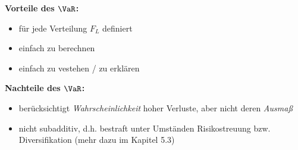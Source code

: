 \textbf{Vorteile des $\VaR$:}
\begin{itemize}[nolistsep, topsep=-\parskip]
	\item für jede Verteilung $F_L$ definiert
	\item einfach zu berechnen
	\item einfach zu vestehen / zu erklären
\end{itemize}

\textbf{Nachteile des $\VaR$:}
\begin{itemize}[nolistsep, topsep=-\parskip]
	\item berücksichtigt \textit{Wahrscheinlichkeit} hoher Verluste, aber nicht deren \textit{Ausmaß}
	\item nicht subadditiv, d.h. bestraft unter Umständen Risikostreuung bzw. Diversifikation (mehr dazu im Kapitel 5.3)
\end{itemize}

